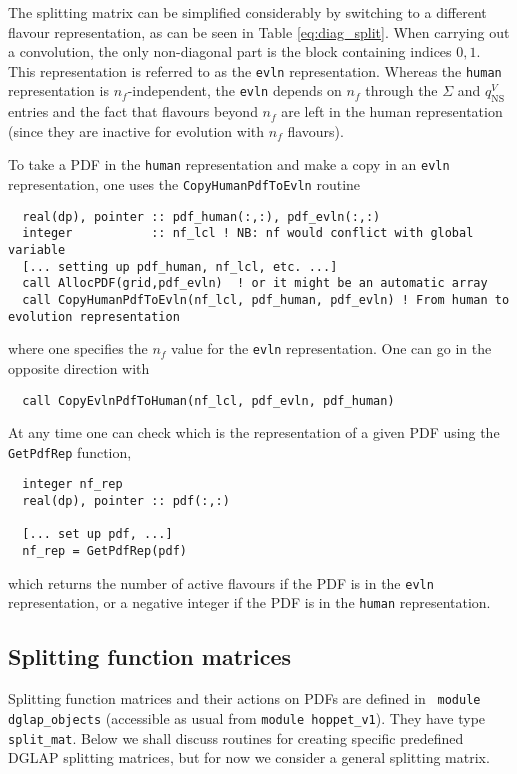 \documentclass[12pt]{article}
\newcommand{\ttt}[1]{\texttt{#1}}
\begin{document}
The splitting matrix can be simplified considerably by switching to a different
flavour representation, as can be seen in Table \ref{eq:diag_split}. 
 When carrying out a convolution, the only non-diagonal part is the
block containing indices $0,1$. This representation is referred to as
the \ttt{evln} representation. Whereas the \ttt{human} representation
is $n_f$-independent, the \ttt{evln} depends on $n_f$ through the
$\Sigma$ and $q_{\mathrm{NS}}^{V}$ entries and the fact that flavours
beyond $n_f$ are left in the human representation (since they are
inactive for evolution with $n_f$ flavours).

To take a PDF in the \ttt{human} representation and make a copy in an
\ttt{evln} representation, one uses the \ttt{CopyHumanPdfToEvln} routine
\begin{lstlisting}
  real(dp), pointer :: pdf_human(:,:), pdf_evln(:,:)
  integer           :: nf_lcl ! NB: nf would conflict with global variable
  [... setting up pdf_human, nf_lcl, etc. ...] 
  call AllocPDF(grid,pdf_evln)  ! or it might be an automatic array
  call CopyHumanPdfToEvln(nf_lcl, pdf_human, pdf_evln) ! From human to evolution representation
\end{lstlisting}
where one specifies the $n_f$ value for the \ttt{evln} representation.
One can go in the opposite direction with
\begin{lstlisting}
  call CopyEvlnPdfToHuman(nf_lcl, pdf_evln, pdf_human)
\end{lstlisting}
At any time one can check which is the representation of a given
PDF using the \ttt{GetPdfRep} function,
\begin{lstlisting}
  integer nf_rep
  real(dp), pointer :: pdf(:,:)

  [... set up pdf, ...]
  nf_rep = GetPdfRep(pdf)
\end{lstlisting}
which returns the number of active flavours if the PDF is in the
\ttt{evln} representation, or a negative integer if 
the PDF is in the
\ttt{human} representation.


\subsection{Splitting function matrices}
\label{sec:splitt-funct-matr}

Splitting function matrices and their actions on PDFs are defined in
   ~\ttt{module dglap\_objects} (accessible as usual from \ttt{module
  hoppet\_v1}). They have type \ttt{split\_mat}. Below we shall discuss
routines for creating specific predefined DGLAP splitting matrices,
but for now we consider a general splitting matrix.
\end{document}
